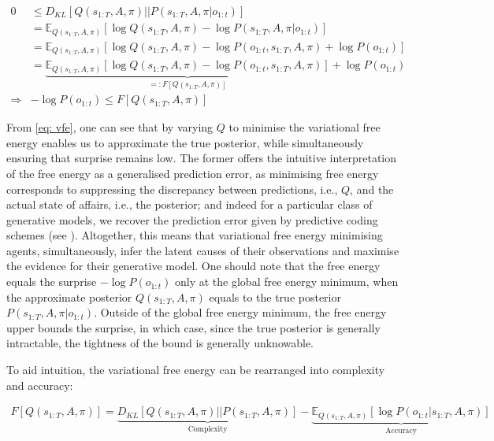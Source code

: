 \documentclass[review,12pt,authoryear]{elsarticle}
\newcommand{\E}{\mathbb E}
\begin{document}
  	\begin{equation}
  	\label{eq: vfe}
  	    \begin{split}
  	        0 &\leq D_{KL}[Q(s_{1:T}, A, \pi)||P(s_{1:T}, A, \pi |o_{1:t})] \\
  	        &= \E_{Q(s_{1:T}, A, \pi)}[\log Q(s_{1:T}, A, \pi) - \log P(s_{1:T}, A, \pi |o_{1:t})] \\
  	        &= \E_{Q(s_{1:T}, A, \pi)}[\log Q(s_{1:T}, A, \pi) - \log P(o_{1:t},s_{1:T}, A, \pi) + \log P(o_{1:t})] \\
  	        &= \underbrace{\E_{Q(s_{1:T}, A, \pi)}[\log Q(s_{1:T}, A, \pi) - \log P(o_{1:t},s_{1:T}, A, \pi)]}_{=:F[Q(s_{1:T}, A, \pi)]} + \log P(o_{1:t}) \\
  	        \Rightarrow & -\log P(o_{1:t}) \leq F[Q(s_{1:T}, A, \pi)]
  	    \end{split}
  	\end{equation}
  	
From \eqref{eq: vfe}, one can see that by varying $Q$ to minimise the variational free energy enables us to approximate the true posterior, while simultaneously ensuring that surprise remains low. The former offers the intuitive interpretation of the free energy as a generalised prediction error, as minimising free energy corresponds to suppressing the discrepancy between predictions, i.e., $Q$, and the actual state of affairs, i.e., the posterior; and indeed for a particular class of generative models, we recover the prediction error given by predictive coding schemes (see \citep{buckleyFreeEnergyPrinciple2017,fristonVariationalFreeEnergy2007,bogaczTutorialFreeenergyFramework2017}). Altogether, this means that variational free energy minimising agents, simultaneously, infer the latent causes of their observations and maximise the evidence for their generative model. One should note that the free energy equals the surprise $-\log P(o_{1:t})$ only at the global free energy minimum, when the approximate posterior $Q(s_{1:T}, A, \pi)$ equals to the true posterior $P(s_{1:T}, A, \pi |o_{1:t})$. Outside of the global free energy minimum, the free energy upper bounds the surprise, in which case, since the true posterior is generally intractable, the tightness of the bound is generally unknowable.

To aid intuition, the variational free energy can be rearranged into complexity and accuracy:

  	\begin{multline}
  	\label{eq: complexity accuracy}
  	    F[Q(s_{1:T}, A, \pi)] = \underbrace{D_{KL}[Q(s_{1:T}, A, \pi)||P(s_{1:T}, A, \pi)]}_{\text{Complexity}}-\underbrace{\E_{Q(s_{1:T}, A, \pi)}[\log P(o_{1:t}|s_{1:T}, A, \pi)]}_{\text{Accuracy}}
  	\end{multline}
  	
\end{document}
